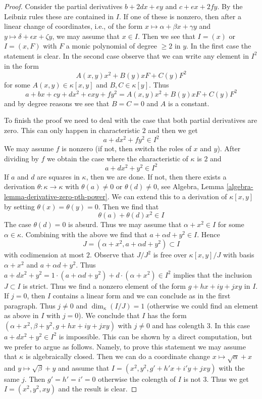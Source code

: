 \documentclass[10pt,a4paper]{amsart}
\theoremstyle{plain}
\theoremstyle{definition}
\theoremstyle{remark}
\numberwithin{equation}{subsection}
\begin{document}
\begin{proof}
Consider the partial derivatives $b + 2dx + ey$ and
$c + ex + 2fy$. By the Leibniz rules these are contained in $I$.
If one of these is nonzero, then after a linear change of coordinates,
i.e., of the form $x \mapsto \alpha + \beta x + \gamma y$ and
$y \mapsto \delta + \epsilon x + \zeta y$, we may assume
that $x \in I$. Then we see that $I = (x)$ or $I = (x, F)$ with
$F$ a monic polynomial of degree $\geq 2$ in $y$.
In the first case the statement is clear. In the second case
observe that we can write any element in $I^2$ in the form
$$
A(x, y) x^2 + B(y) x F + C(y) F^2
$$
for some $A(x, y) \in \kappa[x, y]$ and $B, C \in \kappa[y]$.
Thus
$$
a + b x + c y + d x^2 + exy + f y^2 = A(x, y) x^2 + B(y) x F + C(y) F^2
$$
and by degree reasons we see that $B = C = 0$ and $A$ is a constant.

\medskip\noindent
To finish the proof we need to deal with the case that both
partial derivatives are zero. This can only happen in characteristic $2$
and then we get
$$
a + d x^2 + f y^2 \in I^2
$$
We may assume $f$ is nonzero (if not, then switch the roles of $x$ and $y$).
After dividing by $f$ we obtain the case where the characteristic of
$\kappa$ is $2$ and
$$
a + d x^2 + y^2 \in I^2
$$
If $a$ and $d$ are squares in $\kappa$, then we are done. If not,
then there exists a derivation $\theta : \kappa \to \kappa$ with
$\theta(a) \not = 0$ or $\theta(d) \not = 0$, see
Algebra, Lemma \ref{algebra-lemma-derivative-zero-pth-power}.
We can extend this to a derivation of $\kappa[x, y]$ by setting
$\theta(x) = \theta(y) = 0$. Then we find that
$$
\theta(a) + \theta(d) x^2 \in I
$$
The case $\theta(d) = 0$ is absurd. Thus we may assume
that $\alpha + x^2 \in I$ for some $\alpha \in \kappa$.
Combining with the above we find that $a + \alpha d + y^2 \in I$.
Hence
$$
J = (\alpha + x^2, a + \alpha d + y^2) \subset I
$$
with codimension at most $2$. Observe that
$J/J^2$ is free over $\kappa[x, y]/J$ with basis
$\alpha + x^2$ and $a + \alpha d + y^2$.
Thus $a + d x^2 + y^2 =
1 \cdot (a + \alpha d + y^2) + d \cdot (\alpha + x^2) \in I^2$
implies that the inclusion $J \subset I$ is strict.
Thus we find a nonzero element of the form $g + hx + iy + jxy$ in $I$.
If $j = 0$, then $I$ contains a linear form and we can
conclude as in the first paragraph. Thus $j \not = 0$
and $\dim_\kappa(I/J) = 1$ (otherwise we could find
an element as above in $I$ with $j = 0$).
We conclude that $I$ has the form
$(\alpha + x^2, \beta + y^2, g + hx + iy + jxy)$
with $j \not = 0$ and has colength $3$.
In this case $a + dx^2 + y^2 \in I^2$ is impossible.
This can be shown by a direct computation, but we prefer to argue
as follows. Namely, to prove this statement we may assume that
$\kappa$ is algebraically closed. Then we can do a coordinate
change $x \mapsto \sqrt{\alpha} + x$ and $y \mapsto \sqrt{\beta} + y$
and assume that $I = (x^2, y^2, g' + h'x + i'y + jxy)$ with the same $j$.
Then $g' = h' = i' = 0$ otherwise the colength of $I$ is not $3$.
Thus we get $I = (x^2, y^2, xy)$ and the result is clear.
\end{proof}
\end{document}
